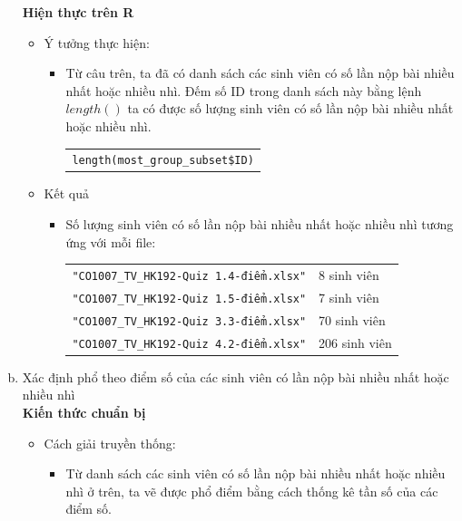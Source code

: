 \documentclass[a4paper]{article}
\theoremstyle{definition}
\begin{document}
\begin{enumerate}[a)]
\begin{itemize}
    \end{itemize}
    \bf Hiện thực trên R\normalfont
    \begin{itemize}
        \item Ý tưởng thực hiện:
        \begin{itemize}
            \item Từ câu trên, ta đã có danh sách các sinh viên có số lần nộp bài nhiều nhất hoặc nhiều nhì. Đếm số ID trong danh sách này bằng lệnh $length()$ ta có được số lượng sinh viên có số lần nộp bài nhiều nhất hoặc nhiều nhì.
            \begin{center}
                \begin{tabular}{p{13cm}}
                    \texttt{length(most\_group\_subset\$ID)}
                \end{tabular}
            \end{center}
        \end{itemize}
        \item Kết quả
        \begin{itemize}
            \item Số lượng sinh viên có số lần nộp bài nhiều nhất hoặc nhiều nhì tương ứng với mỗi file:
            \begin{center}
                \begin{tabular}{l l}
                     \texttt{"CO1007\_TV\_HK192-Quiz 1.4-điểm.xlsx"} & 8 sinh viên\\ 
                     \texttt{"CO1007\_TV\_HK192-Quiz 1.5-điểm.xlsx"} & 7 sinh viên\\ 
                     \texttt{"CO1007\_TV\_HK192-Quiz 3.3-điểm.xlsx"} & 70 sinh viên\\ 
                     \texttt{"CO1007\_TV\_HK192-Quiz 4.2-điểm.xlsx"} & 206 sinh viên\\ 
                \end{tabular}
            \end{center}
        \end{itemize}
    \end{itemize}
    \bf\item {Xác định phổ theo điểm số của các sinh viên có lần nộp bài nhiều nhất hoặc nhiều nhì}\\[6pt]
    \bf Kiến thức chuẩn bị\normalfont
    \begin{itemize}
        \item Cách giải truyền thống:
        \begin{itemize}
            \item Từ danh sách các sinh viên có số lần nộp bài nhiều nhất hoặc nhiều nhì ở trên, ta vẽ được phổ điểm bằng cách thống kê tần số của các điểm số.

\end{itemize}
\end{itemize}
\end{enumerate}
\end{document}
